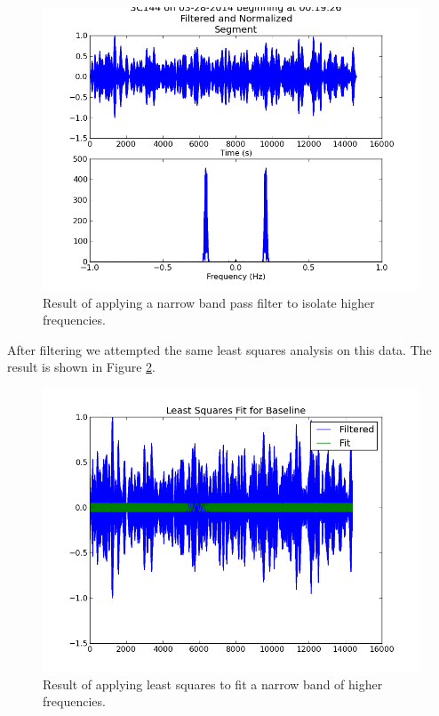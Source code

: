 \documentclass{article}
\begin{document}
    \begin{figure}[h!]
    \centering
    \includegraphics[scale=0.5]{img/crab/baseline_filtered.png}
    \caption{Result of applying a narrow band pass filter to isolate higher
    frequencies.}
    \label{fig:baseline_filtered}
    \end{figure}

    After filtering we attempted the same least squares analysis on this data.
    The result is shown in Figure \ref{fig:fit_baseline}.

    \begin{figure}[h!]
    \centering
    \includegraphics[scale=0.5]{img/crab/fit_baseline.png}
    \caption{Result of applying least squares to fit a narrow band of higher
    frequencies.}
    \label{fig:fit_baseline}
    \end{figure}
\end{document}
